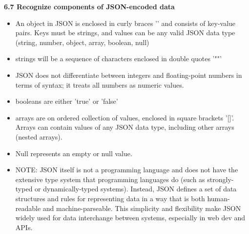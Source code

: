 \documentclass{article}
\begin{document}
\noindent\textbf{6.7 Recognize components of JSON-encoded data}
\begin{itemize}
\item An object in JSON is enclosed in curly braces '{}' and consists of key-value pairs. Keys must be strings, and values can be any valid JSON data type (string, number, object, array, boolean, null)
\item strings will be a sequence of characters enclosed in double quotes '""'
\item JSON does not differentiate between integers and floating-point numbers in terms of syntax; it treats all numbers as numeric values.
\item booleans are either 'true' or 'false' 	
\item arrays are on ordered collection of values, enclosed in square brackets '[]'. Arrays can contain values of any JSON data type, including other arrays (nested arrays).
\item Null represents an empty or null value.
\item NOTE: JSON itself is not a programming language and does not have the extensive type system that programming languages do (such as strongly-typed or dynamically-typed systems). Instead, JSON defines a set of data structures and rules for representing data in a way that is both human-readable and machine-parseable. This simplicity and flexibility make JSON widely used for data interchange between systems, especially in web dev and APIs.
\end{itemize}
\end{document}
